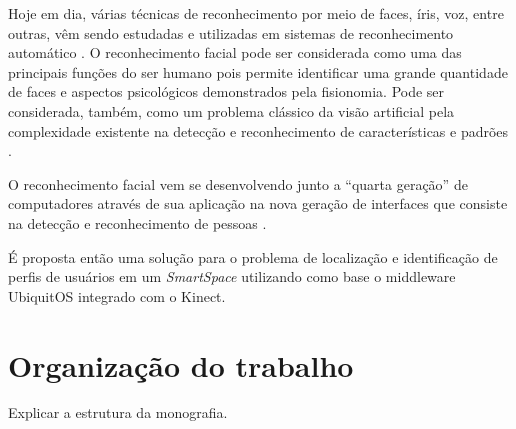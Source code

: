 Hoje em dia, várias técnicas de reconhecimento por meio de faces, íris, voz, entre outras, vêm sendo estudadas e utilizadas em sistemas de reconhecimento automático \cite{bolle}. O reconhecimento facial pode ser considerada como uma das principais funções do ser humano pois permite identificar uma grande quantidade de faces e aspectos psicológicos demonstrados pela fisionomia. Pode ser considerada, também, como um problema clássico da visão artificial pela complexidade existente na detecção e reconhecimento de características e padrões \cite{saocarlos}.

O reconhecimento facial vem se desenvolvendo junto a ``quarta geração'' de computadores através de sua aplicação na nova geração de interfaces que consiste na detecção e reconhecimento de pessoas \cite{saocarlos}. 

É proposta então uma solução para o problema de localização e identificação de perfis de usuários em um \textit{SmartSpace} utilizando como base o middleware UbiquitOS \cite{alegomes} integrado com o Kinect.

\section{Organização do trabalho}

	Explicar a estrutura da monografia.













